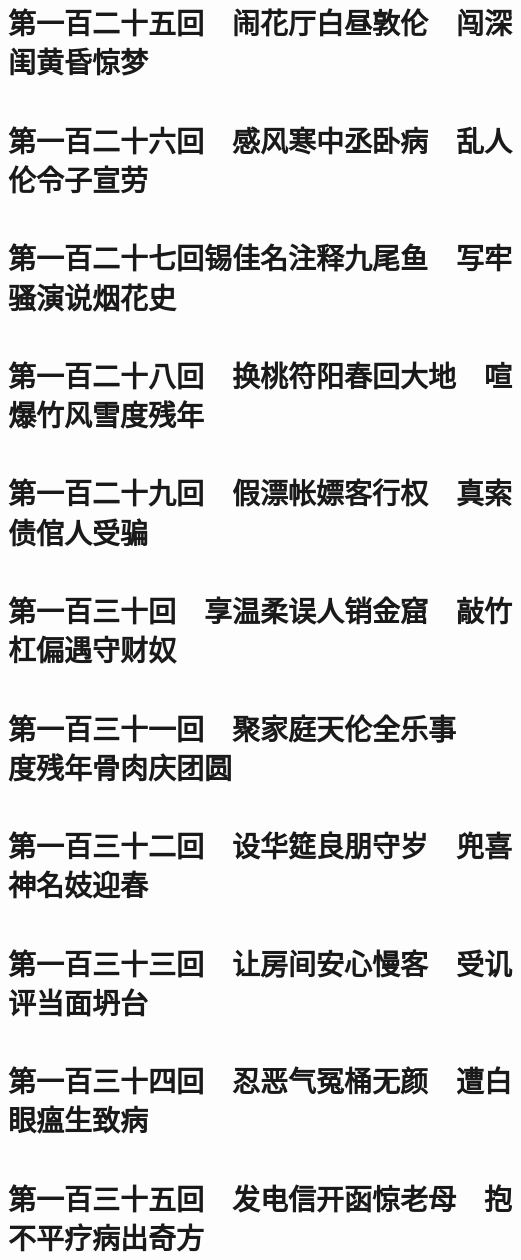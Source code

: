 \documentclass[12pt,UTF8]{ctexbook}
\begin{document}
{\chapter{第一百二十五回　闹花厅白昼敦伦　闯深闺黄昏惊梦}

\chapter{第一百二十六回　感风寒中丞卧病　乱人伦令子宣劳}

\chapter{第一百二十七回锡佳名注释九尾鱼　写牢骚演说烟花史}

\chapter{第一百二十八回　换桃符阳春回大地　喧爆竹风雪度残年}

\chapter{第一百二十九回　假漂帐嫖客行权　真索债倌人受骗}

\chapter{第一百三十回　享温柔误人销金窟　敲竹杠偏遇守财奴}

\chapter{第一百三十一回　聚家庭天伦全乐事　 度残年骨肉庆团圆}

\chapter{第一百三十二回　设华筵良朋守岁　兜喜神名妓迎春}

\chapter{第一百三十三回　让房间安心慢客　受讥评当面坍台}

\chapter{第一百三十四回　忍恶气冤桶无颜　遭白眼瘟生致病}

\chapter{第一百三十五回　发电信开函惊老母　抱不平疗病出奇方}

}
\end{document}
